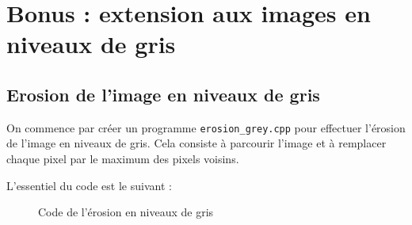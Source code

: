 \documentclass[french,a4paper,10pt]{article}
\begin{document}
	\newpage
	\section{Bonus : extension aux images en niveaux de gris}\label{sec:5}

	\subsection{Erosion de l'image en niveaux de gris}\label{subsec:5.1}

	On commence par créer un programme \texttt{erosion\_grey.cpp} pour effectuer l'érosion de l'image en niveaux de
	gris.
	Cela consiste à parcourir l'image et à remplacer chaque pixel par le maximum des pixels voisins.

	L'essentiel du code est le suivant : %
	\begin{figure}[!htb]
		\centering
		\caption{Code de l'érosion en niveaux de gris}\label{Fig:erosion-grey-code}
	\end{figure}
\end{document}
